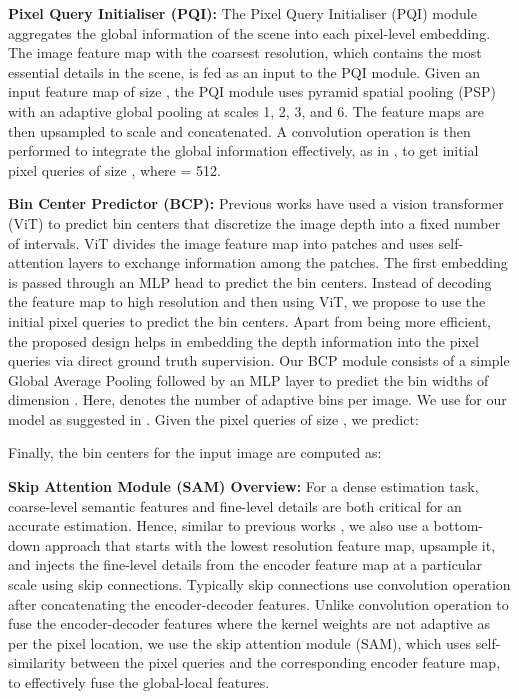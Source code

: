 \documentclass[10pt,twocolumn,letterpaper]{article}
\newcommand{\myfirstpara}[1]{\par \noindent \textbf{#1:}}
\newcommand{\mypara}[1]{\vspace{0.5em} \myfirstpara{#1}}
\begin{document}
\mypara{Pixel Query Initialiser (PQI)}
The Pixel Query Initialiser (PQI) module aggregates the global information of the scene into each pixel-level embedding. The image feature map with the coarsest resolution, which contains the most essential details in the scene, is fed as an input to the PQI module. Given an input feature map of size , the PQI module uses pyramid spatial pooling (PSP) \cite{psp} with an adaptive global pooling at scales 1, 2, 3, and 6. The feature maps are then upsampled to  scale and concatenated. A convolution operation is then performed to integrate the global information effectively, as in \cite{newcrf}, to get initial pixel queries  of size , where  = 512.

\mypara{Bin Center Predictor (BCP)}
Previous works \cite{adabins} have used a vision transformer (ViT) to predict bin centers that discretize the image depth into a fixed number of intervals. ViT divides the image feature map into  patches and uses self-attention layers to exchange information among the patches. The first embedding is passed through an MLP head to predict the bin centers. Instead of decoding the feature map to high resolution and then using ViT, we propose to use the initial pixel queries to predict the bin centers. Apart from being more efficient, the proposed design helps in embedding the depth information into the pixel queries via direct ground truth supervision. 
Our BCP module consists of a simple Global Average Pooling followed by an MLP layer to predict the bin widths  of dimension . Here,  denotes the number of adaptive bins per image. We use  for our model as suggested in \cite{adabins}. 
Given the pixel queries  of size , we predict:

Finally, the bin centers for the input image are computed as:


\mypara{Skip Attention Module (SAM) Overview}
For a dense estimation task, coarse-level semantic features and fine-level details are both critical for an accurate estimation. Hence, similar to previous works \cite{fpn, newcrf}, we also use a bottom-down approach that starts with the lowest resolution feature map, upsample it, and injects the fine-level details from the encoder feature map at a particular scale using skip connections. 
Typically skip connections use convolution operation after concatenating the encoder-decoder features.
Unlike convolution operation to fuse the encoder-decoder features where the kernel weights are not adaptive as per the pixel location, we use the skip attention module (SAM), which uses self-similarity between the pixel queries and the corresponding encoder feature map, to effectively fuse the global-local features. 
\end{document}
